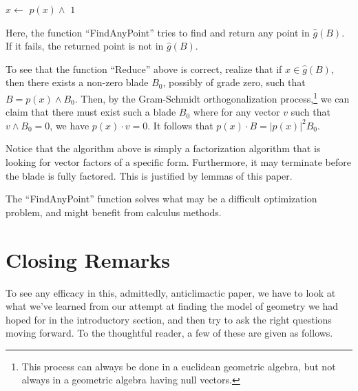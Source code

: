 \documentclass{birkjour}
\theoremstyle{definition}
\theoremstyle{remark}
\numberwithin{equation}{section}
\newcommand{\gh}{\hat{g}}
\begin{document}
\begin{algorithmic}
	\State $x\gets$
	\If{$x\in\gh(B)$}
		\State\Return $p(x)\wedge$
	\EndIf
	\State\Return $1$
\EndFunction
\end{algorithmic}
Here, the function ``FindAnyPoint'' tries to find and return any point in $\gh(B)$.
If it fails, the returned point is not in $\gh(B)$.

To see that the function ``Reduce'' above is correct, realize that if
$x\in\gh(B)$, then there exists a non-zero blade $B_0$, possibly of grade zero, such that $B=p(x)\wedge B_0$.
Then, by the Gram-Schmidt orthogonalization process,\footnote{This process can always be done in a euclidean geometric algebra,
but not always in a geometric algebra having null vectors.} we can claim that there must exist such a blade $B_0$
where for any vector $v$ such that $v\wedge B_0=0$, we have $p(x)\cdot v=0$.  It follows that
$p(x)\cdot B = |p(x)|^2B_0$.

Notice that the algorithm above is simply a factorization algorithm that is
looking for vector factors of a specific form.  Furthermore, it may
terminate before the blade is fully factored.  This is justified by lemmas
of this paper.

The ``FindAnyPoint'' function solves what may be a difficult optimization problem,
and might benefit from calculus methods.

\section{Closing Remarks}

To see any efficacy in this, admittedly, anticlimactic paper, we have to look at what
we've learned from our attempt at finding the model of geometry we had hoped
for in the introductory section, and then try to ask the right questions moving forward.
To the thoughtful reader, a few of these are given as follows.
\end{document}
